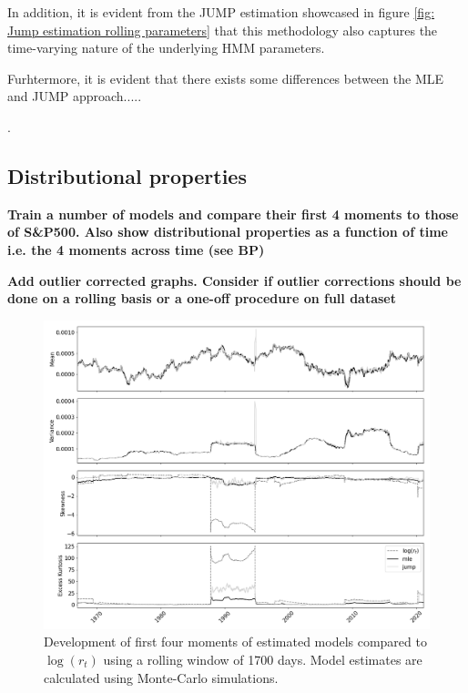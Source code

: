 In addition, it is evident from the JUMP estimation showcased in figure \ref{fig: Jump estimation rolling parameters} that this methodology also captures the time-varying nature of the underlying HMM parameters. 

Furhtermore, it is evident that there exists some differences between the MLE and JUMP approach.....


. 




\subsection{Distributional properties}

\textbf{Train a number of models and compare their first 4 moments to those of S\&P500. Also show distributional properties as a function of time i.e. the 4 moments across time (see BP)}

\textbf{Add outlier corrected graphs. Consider if outlier corrections should be done on a rolling basis or a one-off procedure on full dataset}

\begin{figure}[H] 
    \centering
    \includegraphics[width=1.0\textwidth]{analysis/stylized_facts/images/rolling_moments.png}
    \caption{Development of first four moments of estimated models compared to $\log(r_t)$ using a rolling window of 1700 days. Model estimates are calculated using Monte-Carlo simulations.}
    \label{fig:stylized_facts_rolling_moments} 
\end{figure}

